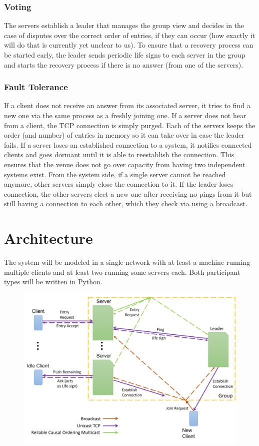 \documentclass[runningheads]{llncs}
\begin{document}
\subsubsection{Voting}
The servers establish a leader that manages the group view and decides in the case of disputes over the correct order of entries, if they can occur (how exactly it will do that is currently yet unclear to us).
To ensure that a recovery process can be started early, the leader sends periodic life signs to each server in the group and starts the recovery process if there is no answer (from one of the servers).

\subsubsection{Fault Tolerance}
If a client does not receive an answer from its associated server, it tries to find a new one via the same process as a freshly joining one.
If a server does not hear from a client, the TCP connection is simply purged.
Each of the servers keeps the order (and number) of entries in memory so it can take over in case the leader fails.
If a server loses an established connection to a system, it notifies connected clients and goes dormant until it is able to reestablish the connection.
This ensures that the venue does not go over capacity from having two independent systems exist.
From the system side, if a single server cannot be reached anymore, other servers simply close the connection to it.
If the leader loses connection, the other servers elect a new one after receiving no pings from it but still having a connection to each other, which they check via using a broadcast.
\section{Architecture}
The system will be modeled in a single network with at least a machine running multiple clients and at least two running some servers each.
Both participant types will be written in Python.\\
\begin{figure}
\includegraphics[width=\textwidth]{Architecture_Diagram.png}
\end{figure}
\end{document}
